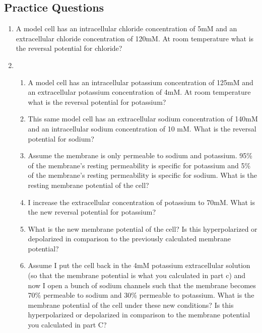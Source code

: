 \documentclass[a4paper,9pt]{extarticle}
\begin{document}
\begin{multicols*}{2}
\section*{Practice Questions}
\begin{enumerate}
  \item A model cell has an intracellular chloride concentration of 5mM and an extracellular chloride concentration of 120mM. At room temperature what is the reversal potential for chloride?
  \item \begin{enumerate}
     \item A model cell has an intracellular potassium concentration of 125mM and an extracellular potassium concentration of 4mM. At room temperature what is the reversal potential for potassium?
     \item This same model cell has an extracellular sodium concentration of 140mM and an intracellular sodium concentration of 10 mM. What is the reversal potential for sodium?
     \item Assume the membrane is only permeable to sodium and potassium. 95\% of the membrane's resting permeability is specific for potassium and 5\% of the membrane's resting permeability is specific for sodium. What is the resting membrane potential of the cell?
     \item I increase the extracellular concentration of potassium to 70mM. What is the new reversal potential for potassium? 
     \item What is the new membrane potential of the cell? Is this hyperpolarized or depolarized in comparison to the previously calculated membrane potential?
     \item Assume I put the cell back in the 4mM potassium extracellular solution (so that the membrane potential is what you calculated in part c) and now I open a bunch of sodium channels such that the membrane becomes 70\% permeable to sodium and 30\% permeable to potassium. What is the membrane potential of the cell under these new conditions? Is this hyperpolarized or depolarized in comparison to the membrane potential you calculated in part C?
     \end{enumerate}
\end{enumerate}

\end{multicols*}
\end{document}
